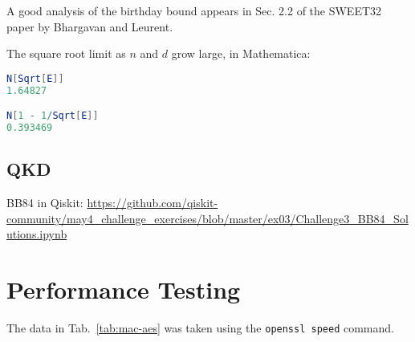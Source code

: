 \documentclass[%
 aip,
 jmp,%
 amsmath,amssymb,
 reprint,%
]{revtex4-1}
\begin{document}
A good analysis of the birthday bound appears in Sec. 2.2 of the
SWEET32 paper by Bhargavan and Leurent.

The square root limit as $n$ and $d$ grow large, in Mathematica:

\begin{lstlisting}[language=Mathematica]
N[Sqrt[E]]
1.64827

N[1 - 1/Sqrt[E]]
0.393469
\end{lstlisting}

\subsection{QKD}

BB84 in Qiskit:
\url{https://github.com/qiskit-community/may4_challenge_exercises/blob/master/ex03/Challenge3_BB84_Solutions.ipynb}

\section{Performance Testing}


The data in Tab.~\ref{tab:mac-aes} was taken using the \verb|openssl speed| command.
\end{document}
